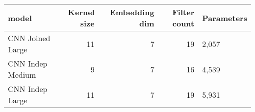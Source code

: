 \begin{tabular}{lrrrl}
\toprule
model & Kernel size & Embedding dim & Filter count & Parameters \\
\midrule
CNN Joined Large & 11 & 7 & 19 & 2,057 \\
CNN Indep Medium & 9 & 7 & 16 & 4,539 \\
CNN Indep Large & 11 & 7 & 19 & 5,931 \\
\bottomrule
\end{tabular}

